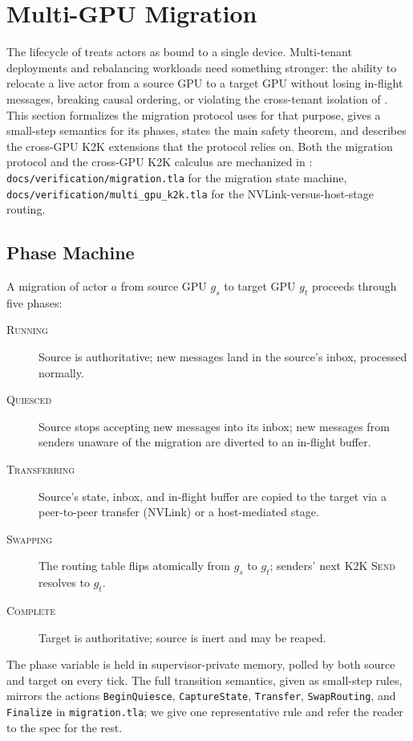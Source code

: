 \section{Multi-GPU Migration}
\label{sec:migration}

The lifecycle of  treats actors as bound to a single
device.  Multi-tenant deployments and rebalancing workloads need
something stronger: the ability to relocate a live actor from a
source GPU to a target GPU without losing in-flight messages,
breaking causal ordering, or violating the cross-tenant isolation of
.  This section formalizes the migration protocol
\system{} uses for that purpose, gives a small-step semantics for
its phases, states the main safety theorem, and describes the
cross-GPU K2K extensions that the protocol relies on.  Both the
migration protocol and the cross-GPU K2K calculus are mechanized in
\TLA{}: \texttt{docs/verification/migration.tla} for the migration
state machine, \texttt{docs/verification/multi\_gpu\_k2k.tla} for the
NVLink-versus-host-stage routing.

\subsection{Phase Machine}
\label{sec:migration:phases}

A migration of actor \(a\) from source GPU \(g_s\) to target GPU
\(g_t\) proceeds through five phases:

\begin{description}
\item[\textsc{Running}] Source is authoritative; new messages land
in the source's inbox, processed normally.
\item[\textsc{Quiesced}] Source stops accepting new messages into
its inbox; new messages from senders unaware of the migration are
diverted to an in-flight buffer.
\item[\textsc{Transferring}] Source's state, inbox, and in-flight
buffer are copied to the target via a peer-to-peer transfer
(NVLink) or a host-mediated stage.
\item[\textsc{Swapping}] The routing table flips atomically from
\(g_s\) to \(g_t\); senders' next K2K \textsc{Send} resolves to
\(g_t\).
\item[\textsc{Complete}] Target is authoritative; source is inert
and may be reaped.
\end{description}

The phase variable is held in supervisor-private memory, polled by
both source and target on every tick.  The full transition
semantics, given as small-step rules, mirrors the \TLA{} actions
\texttt{BeginQuiesce}, \texttt{CaptureState}, \texttt{Transfer},
\texttt{SwapRouting}, and \texttt{Finalize} in
\texttt{migration.tla}; we give one representative rule and refer
the reader to the spec for the rest.

